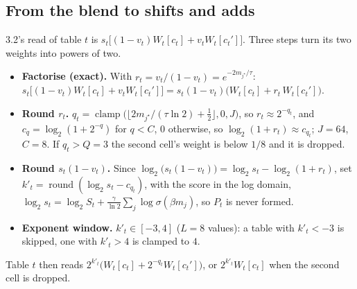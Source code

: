 \documentclass[10pt]{article}
\begin{document}
\subsection*{From the blend to shifts and adds}
3.2's read of table $t$ is $s_t\big[(1-v_t)W_t[c_t]+v_tW_t[c_t']\big]$. Three steps turn its two weights into powers of two.
\begin{itemize}\setlength\itemsep{1pt}
\item \textbf{Factorise (exact).} With $r_t=v_t/(1-v_t)=e^{-2m_{j^\star}/\tau}$: \ $s_t\big[(1-v_t)W_t[c_t]+v_tW_t[c_t']\big]=s_t(1-v_t)\big(W_t[c_t]+r_t\,W_t[c_t']\big)$.
\item \textbf{Round $r_t$.} $q_t=\operatorname{clamp}\big(\lfloor 2m_{j^\star}/(\tau\ln2)+\tfrac12\rfloor,0,J\big)$, so $r_t\approx2^{-q_t}$, and $c_{q}=\log_2(1+2^{-q})$ for $q<C$, $0$ otherwise, so $\log_2(1+r_t)\approx c_{q_t}$;
  $J=64$, $C=8$. If $q_t>Q=3$ the second cell's weight is below $1/8$ and it is dropped.
\item \textbf{Round $s_t(1-v_t)$.} Since $\log_2\big(s_t(1-v_t)\big)=\log_2s_t-\log_2(1+r_t)$, set $k'_t=\operatorname{round}(\log_2s_t-c_{q_t})$, with the score in the log domain,
  $\log_2s_t=\log_2S_t+\frac{\gamma}{\ln2}\sum_j\log\sigma(\beta m_j)$, so $P_t$ is never formed.
\item \textbf{Exponent window.} $k'_t\in[-3,4]$ ($L=8$ values): a table with $k'_t<-3$ is skipped, one with $k'_t>4$ is clamped to $4$.
\end{itemize}
Table $t$ then reads $2^{k'_t}\big(W_t[c_t]+2^{-q_t}W_t[c_t']\big)$, or $2^{k'_t}W_t[c_t]$ when the second cell is dropped.
\end{document}
